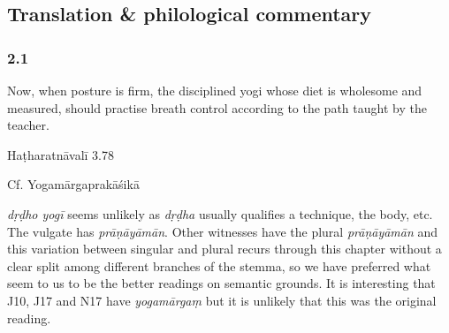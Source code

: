 


\pagestyle{HPed}
\begin{ekdosis}

\chapter*{Translation \& philological commentary}
\subsection*{2.1}
\begin{translation}[hp02_001]
Now, when posture is firm, the disciplined yogi whose diet is wholesome and measured, should practise breath control according to the path taught by the teacher.
\end{translation}

\begin{sources}[hp02_001]
\end{sources}

\begin{testimonia}[hp02_001]
Haṭharatnāvalī 3.78

\begin{versinnote}
\end{versinnote}

Cf. Yogamārgaprakāśikā

\begin{versinnote}
\end{versinnote}
\end{testimonia}

\begin{philcomm}[hp02_001]
\emph{dṛḍho yogī} seems unlikely as \emph{dṛḍha} usually qualifies a technique, the body, etc.
The vulgate has \emph{prāṇāyāmān}. Other witnesses have the plural \emph{prāṇāyāmān} and this variation between singular and plural recurs through this chapter without a clear split among different branches of the stemma, so we have preferred what seem to us to be the better readings on semantic grounds.
It is interesting that J10, J17 and N17 have \emph{yogamārgaṃ} but it is unlikely that this was the original reading.
\end{philcomm}


\end{ekdosis}

